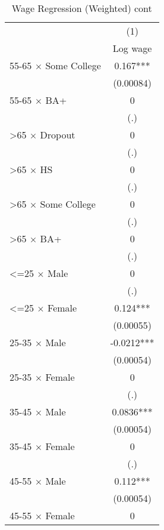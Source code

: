 \begin{table}[htbp]\centering
\def\sym#1{\ifmmode^{#1}\else\(^{#1}\)\fi}
\caption{Wage Regression (Weighted) cont}
\footnotesize
\begin{tabular}{l*{1}{c}}
\toprule
                    &\multicolumn{1}{c}{(1)}\\
                    &\multicolumn{1}{c}{Log wage}\\
\midrule


55-65 $\times$ Some College&       0.167***\\
                    &   (0.00084)   \\
55-65 $\times$ BA+  &           0   \\
                    &         (.)   \\
>65 $\times$ Dropout&           0   \\
                    &         (.)   \\
>65 $\times$ HS     &           0   \\
                    &         (.)   \\
>65 $\times$ Some College&           0   \\
                    &         (.)   \\
>65 $\times$ BA+    &           0   \\
                    &         (.)   \\
<=25 $\times$ Male  &           0   \\
                    &         (.)   \\
<=25 $\times$ Female&       0.124***\\
                    &   (0.00055)   \\
25-35 $\times$ Male &     -0.0212***\\
                    &   (0.00054)   \\
25-35 $\times$ Female&           0   \\
                    &         (.)   \\
35-45 $\times$ Male &      0.0836***\\
                    &   (0.00054)   \\
35-45 $\times$ Female&           0   \\
                    &         (.)   \\
45-55 $\times$ Male &       0.112***\\
                    &   (0.00054)   \\
45-55 $\times$ Female&           0   \\

\end{tabular}
\end{table}
